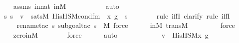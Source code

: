 \begin{isabellebody}
\ \ \ \ \isamarkupfalse%
\ assms\ innat\ inM\isanewline
\ \ \ \ \ \ \ \ \ \isamarkupfalse%
\ auto{\isacharbrackleft}{\kern0pt}{}{\isacharbrackright}{\kern0pt}\isanewline
\ \ \ \ \isamarkupfalse%
\isanewline
\isanewline
\ \ \isamarkupfalse%
\ \isamarkupfalse%
\ {\isachardoublequoteopen}{\isachardot}{\kern0pt}{\isachardot}{\kern0pt}{\isachardot}{\kern0pt}\ {\isasymlongleftrightarrow}\ {\isacharparenleft}{\kern0pt}{\isasymforall}s{\isachardot}{\kern0pt}\ s\ {\isasymin}\ v\ {\isasymlongleftrightarrow}\ sats{\isacharparenleft}{\kern0pt}M{\isacharcomma}{\kern0pt}\ His{\isacharunderscore}{\kern0pt}HS{\isacharunderscore}{\kern0pt}M{\isacharunderscore}{\kern0pt}cond{\isacharunderscore}{\kern0pt}fm{\isacharparenleft}{\kern0pt}{}{\isacharcomma}{\kern0pt}\ {}{\isacharparenright}{\kern0pt}{\isacharcomma}{\kern0pt}\ {\isacharbrackleft}{\kern0pt}x{\isacharprime}{\kern0pt}{\isacharcomma}{\kern0pt}\ g{\isacharbrackright}{\kern0pt}{\isacharparenright}{\kern0pt}\ {\isasymand}\ s\ {\isacharequal}{\kern0pt}\ {}{\isacharparenright}{\kern0pt}{\isachardoublequoteclose}\ \isanewline
\ \ \ \ \isamarkupfalse%
{\isacharparenleft}{\kern0pt}rule\ iffI{\isacharcomma}{\kern0pt}\ clarify{\isacharcomma}{\kern0pt}\ rule\ iffI{\isacharparenright}{\kern0pt}\isanewline
\ \ \ \ \ \ \isamarkupfalse%
{\isacharparenleft}{\kern0pt}rename{\isacharunderscore}{\kern0pt}tac\ s{\isacharcomma}{\kern0pt}\ subgoal{\isacharunderscore}{\kern0pt}tac\ {\isachardoublequoteopen}s\ {\isasymin}\ M{\isachardoublequoteclose}{\isacharcomma}{\kern0pt}\ force{\isacharparenright}{\kern0pt}\isanewline
\ \ \ \ \isamarkupfalse%
\ inM\ transM\ \isanewline
\ \ \ \ \ \ \isamarkupfalse%
\ force\isanewline
\ \ \ \ \isamarkupfalse%
\ zero{\isacharunderscore}{\kern0pt}in{\isacharunderscore}{\kern0pt}M\ \isanewline
\ \ \ \ \ \isamarkupfalse%
\ force\isanewline
\ \ \ \ \isamarkupfalse%
\ auto\isanewline
\ \ \ \ \isamarkupfalse%
\isanewline
\isanewline
\ \ \isamarkupfalse%
\ \isamarkupfalse%
\ {\isachardoublequoteopen}{\isachardot}{\kern0pt}{\isachardot}{\kern0pt}{\isachardot}{\kern0pt}\ {\isasymlongleftrightarrow}\ v\ {\isacharequal}{\kern0pt}\ His{\isacharunderscore}{\kern0pt}HS{\isacharunderscore}{\kern0pt}M{\isacharparenleft}{\kern0pt}x{\isacharprime}{\kern0pt}{\isacharcomma}{\kern0pt}\ g{\isacharparenright}{\kern0pt}{\isachardoublequoteclose}\ \isanewline

\end{isabellebody}
